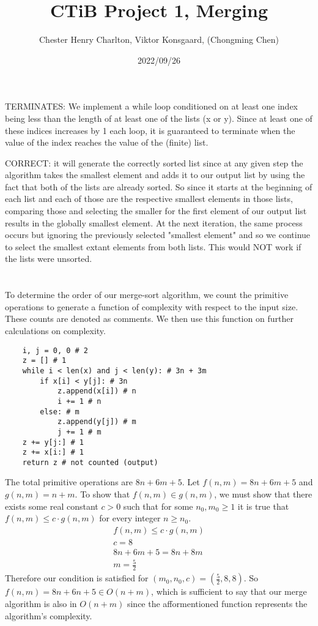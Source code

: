 \documentclass{article}
\title{CTiB Project 1, Merging}
\author{Chester Henry Charlton, Viktor Konsgaard, (Chongming Chen)}
\date{2022/09/26}
\begin{document}
\maketitle

\section{}

    TERMINATES: We implement a while loop conditioned on at least one
    index being less than the length of at least one of the lists (x or y). 
    Since at least one of these indices increases by 1 each loop, it is guaranteed
    to terminate when the value of the index reaches the value of the (finite) list. 

    CORRECT: it will generate the correctly sorted list since at any given step
    the algorithm takes the smallest element and adds it to our output list by 
    using the fact that both of the lists are already sorted. So since it starts
    at the beginning of each list and each of those are the respective smallest 
    elements in those lists, comparing those and selecting the smaller for the first 
    element of our output list results in the globally smallest element. At the next 
    iteration, the same process occurs but ignoring the previously selected "smallest 
    element" and so we continue to select the smallest extant elements from both lists. This would NOT work if the lists were unsorted.
\section{}
To determine the order of our merge-sort algorithm, we count the primitive operations 
to generate a function of complexity with respect to the input size. These counts
are denoted as comments. We then use this function on further calculations on complexity. 
\begin{lstlisting}
    i, j = 0, 0 # 2
    z = [] # 1
    while i < len(x) and j < len(y): # 3n + 3m
        if x[i] < y[j]: # 3n
            z.append(x[i]) # n
            i += 1 # n
        else: # m
            z.append(y[j]) # m
            j += 1 # m
    z += y[j:] # 1
    z += x[i:] # 1
    return z # not counted (output)
\end{lstlisting}
The total primitive operations are  $8n + 6m + 5$. Let $f(n,m) = 8n + 6m + 5$ and 
$g(n,m) = n + m$. To show that $f(n,m) \in g(n,m)$, we must show that there exists 
some real constant $c > 0$ such that for some $n_0,m_0 \geq 1$ it is true that 
$f(n,m) \leq c \cdot g(n,m)$ for every integer $n \geq n_0$. 
\begin{align*}
    f(n,m) \leq c \cdot g(n,m) \\
    c = 8 \\
    8n + 6m + 5 = 8n + 8m \\
    m = \frac 5 2 
\end{align*}
Therefore our condition is satisfied for $(m_0, n_0, c) = (\frac 5 2, 8, 8)$.
So $f(n,m) = 8n + 6n + 5 \in O(n +m)$, which is sufficient to say that our merge 
algorithm is also in $O(n+m)$ since the afformentioned function represents the 
algorithm's complexity. 
\end{document}
